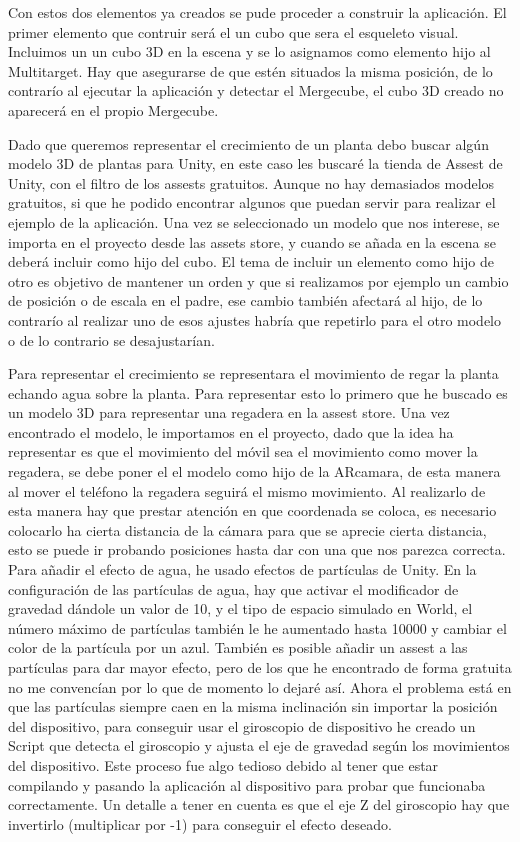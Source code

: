 Con estos dos elementos ya creados se pude proceder a construir la aplicación. El primer elemento que contruir será el un cubo que sera el esqueleto visual. Incluimos un un cubo 3D en la escena y se lo asignamos como elemento hijo al Multitarget. Hay que asegurarse de que estén situados la misma posición, de lo contrarío al ejecutar la aplicación y detectar el Mergecube, el cubo 3D creado no aparecerá en el propio Mergecube.

Dado que queremos representar el crecimiento de un planta debo buscar algún modelo 3D de plantas para Unity, en este caso les buscaré la tienda de Assest de Unity, con el filtro de los assests gratuitos. Aunque no hay demasiados modelos gratuitos, si que he podido encontrar algunos que puedan servir para realizar el ejemplo de la aplicación. Una vez se seleccionado un modelo que nos interese, se importa en el proyecto desde las assets store, y cuando se añada en la escena se deberá incluir como hijo del cubo. El tema de incluir un elemento como hijo de otro es objetivo de mantener un orden y que si realizamos por ejemplo un cambio de posición o de escala en el padre, ese cambio también afectará al hijo, de lo contrarío al realizar uno de esos ajustes habría que repetirlo para el otro modelo o de lo contrario se desajustarían.

Para representar el crecimiento se representara el movimiento de regar la planta echando agua sobre la planta. Para representar esto lo primero que he buscado es un modelo 3D para representar una regadera en la assest store. Una vez encontrado el modelo, le importamos en el proyecto, dado que la idea ha representar es que el movimiento del móvil sea el movimiento como mover la regadera, se debe poner el el modelo como hijo de la ARcamara, de esta manera al mover el teléfono la regadera seguirá el mismo movimiento. Al realizarlo de esta manera hay que prestar atención en que coordenada se coloca, es necesario colocarlo ha cierta distancia de la cámara para que se aprecie cierta distancia, esto se puede ir probando posiciones hasta dar con una que nos parezca correcta. Para añadir el efecto de agua, he usado efectos de partículas de Unity. En la configuración de las partículas de agua, hay que activar el modificador de gravedad dándole un valor de 10, y el tipo de espacio simulado en World, el número máximo de partículas también le he aumentado hasta 10000 y cambiar el color de la partícula por un azul. También es posible añadir un assest a las partículas para dar mayor efecto, pero de los que he encontrado de forma gratuita no me convencían por lo que de momento lo dejaré así. Ahora el problema está en que las partículas siempre caen en la misma inclinación sin importar la posición del dispositivo, para conseguir usar el giroscopio de dispositivo he creado un Script que detecta el giroscopio y ajusta el eje de gravedad según los movimientos del dispositivo. Este proceso fue algo tedioso debido al tener que estar compilando y pasando la aplicación al dispositivo para probar que funcionaba correctamente. Un detalle a tener en cuenta es que el eje Z del giroscopio hay que invertirlo (multiplicar por -1) para conseguir el efecto deseado.

